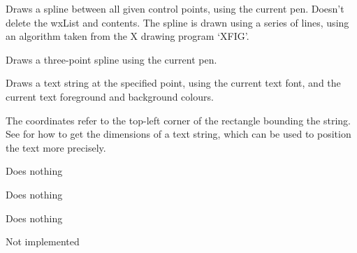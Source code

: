 \label{wxsvgfiledcdrawspline}


Draws a spline between all given control points, using the current
pen.  Doesn't delete the wxList and contents. The spline is drawn
using a series of lines, using an algorithm taken from the X drawing
program `XFIG'.


Draws a three-point spline using the current pen.

\label{wxsvgfiledcdrawtext}


Draws a text string at the specified point, using the current text font,
and the current text foreground and background colours.

The coordinates refer to the top-left corner of the rectangle bounding
the string. See  for how
to get the dimensions of a text string, which can be used to position the
text more precisely.



\label{wxsvgfiledcenddoc}


Does nothing

\label{wxsvgfiledcenddrawing}


Does nothing

\label{wxsvgfiledcendpage}


Does nothing

\label{wxsvgfiledcfloodfill}


Not implemented

\label{wxsvgfiledcgetbackground}

